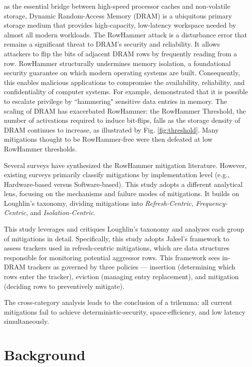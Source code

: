 \documentclass[journal,twocolumn]{IEEEtran}
\begin{document}
 as the essential bridge between high-speed processor caches and non-volatile storage, Dynamic Random-Access Memory (DRAM) is a ubiquitous primary storage medium that provides high-capacity, low-latency workspace needed by almost all modern workloads. The RowHammer attack\cite{Kim14} is a disturbance error that remains a significant threat to DRAM's security and reliability. It allows attackers to flip the bits of adjacent DRAM rows by frequently reading from a row. RowHammer structurally undermines memory isolation, a foundational security guarantee on which modern operating systems are built. Consequently, this enables malicious applications to compromise the availability, reliability, and confidentiality of computer systems. For example, \cite{Seaborn15} demonstrated that it is possible to escalate privilege by ``hammering" sensitive data entries in memory. The scaling of DRAM has exacerbated RowHammer: the RowHammer Threshold, the number of activations required to induce bit-flips, falls as the storage density of DRAM continues to increase, as illustrated by Fig. \ref{fig:threshold}. Many mitigations thought to be RowHammer-free were then defeated at low RowHammer thresholds\cite{Orosa21}.

Several surveys have synthesized the RowHammer mitigation literature. However, existing surveys primarily classify mitigations by implementation level (e.g., Hardware-based versus Software-based). This study adopts a different analytical lens, focusing on the mechanisms and failure modes of mitigations. It builds on Loughlin's taxonomy\cite{Loughlin21}, dividing mitigations into \textit{Refresh-Centric, Frequency-Centric}, and \textit{Isolation-Centric}.

This study leverages and critiques Loughlin's taxonomy and analyzes each group of mitigations in detail. Specifically, this study adopts Jaleel's\cite{Jaleel24} framework to assess trackers used in refresh-centric mitigations, which are data structures responsible for monitoring potential aggressor rows. This framework sees in-DRAM trackers as governed by three policies --- insertion  (determining which rows enter the tracker), eviction (managing entry replacement), and mitigation (deciding rows to preventively mitigate).

The cross-category analysis leads to the conclusion of a trilemma: all current mitigations fail to achieve deterministic-security, space-efficiency, and low latency simultaneously.

\section{Background}\label{sec:bg}
\end{document}
